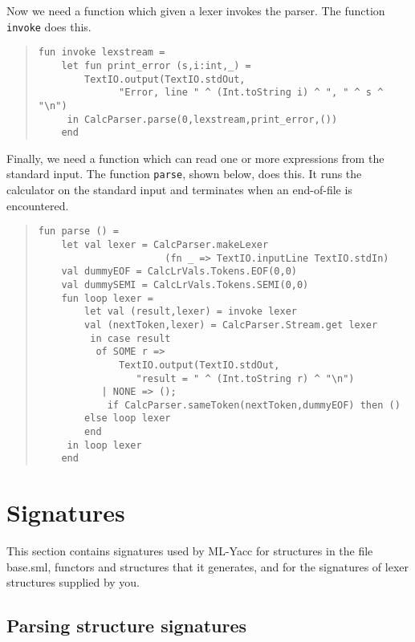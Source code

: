 Now we need a function which given a lexer invokes the parser.  The
function {\tt invoke} does this.

\begin{quote}
\begin{verbatim}
fun invoke lexstream =
    let fun print_error (s,i:int,_) =
	    TextIO.output(TextIO.stdOut,
			  "Error, line " ^ (Int.toString i) ^ ", " ^ s ^ "\n")
     in CalcParser.parse(0,lexstream,print_error,())
    end
\end{verbatim}
\end{quote}

Finally, we need a function which can read one or more expressions from
the standard input.  The function {\tt parse}, shown below, does this.
It runs the calculator on the standard input and terminates 
when an end-of-file is encountered.

\begin{quote}
\begin{verbatim}
fun parse () = 
    let val lexer = CalcParser.makeLexer
                      (fn _ => TextIO.inputLine TextIO.stdIn)
	val dummyEOF = CalcLrVals.Tokens.EOF(0,0)
	val dummySEMI = CalcLrVals.Tokens.SEMI(0,0)
	fun loop lexer =
	    let val (result,lexer) = invoke lexer
		val (nextToken,lexer) = CalcParser.Stream.get lexer
	     in case result
		  of SOME r =>
		      TextIO.output(TextIO.stdOut,
			     "result = " ^ (Int.toString r) ^ "\n")
		   | NONE => ();
	        if CalcParser.sameToken(nextToken,dummyEOF) then ()
		else loop lexer
	    end
     in loop lexer
    end
\end{verbatim}
\end{quote}

\section{Signatures}

This section contains signatures used by ML-Yacc for structures in
the file base.sml, functors and structures that it generates, and for
the signatures of lexer structures supplied by you.

\subsection{Parsing structure signatures}

